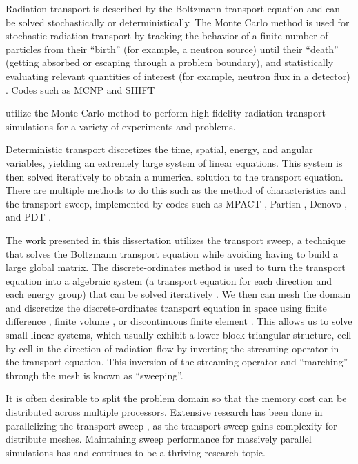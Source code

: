 Radiation transport is described by the Boltzmann transport equation \cite{bell_glasstone,zweifel,davison,duderstadt} and can be solved stochastically or deterministically. 
The Monte Carlo method is used for stochastic radiation transport by tracking the behavior of a finite number of particles from their ``birth'' (for example, a neutron source) until their ``death'' (getting absorbed or escaping through a problem boundary), and statistically evaluating relevant quantities of interest (for example, neutron flux in a detector) \cite{shultis_mc}.
Codes such as MCNP \cite{MCNP} and SHIFT {\cite{shift} utilize the Monte Carlo method to perform high-fidelity radiation transport simulations for a variety of experiments and problems.

Deterministic transport discretizes the time, spatial, energy, and angular variables, yielding an extremely large system of linear equations. This system is then solved iteratively to obtain a numerical solution to the transport equation.
There are multiple methods to do this such as the method of characteristics and the transport sweep, implemented by codes such as MPACT \cite{mpact}, Partisn \cite{partisn}, Denovo \cite{denovo}, and PDT \cite{mpadams2013,mpadams2015}.

The work presented in this dissertation utilizes the transport sweep, a technique that solves the Boltzmann transport equation while avoiding having to build a large global matrix.
The discrete-ordinates method \cite{denovo} is used to turn the transport equation into a algebraic system (a transport equation for each direction and each energy group) that can be solved iteratively \cite{adams_larsen}.
We then can mesh the domain and discretize the discrete-ordinates transport equation in space using finite difference \cite{fd}, finite volume \cite{fd}, or discontinuous finite element \cite{Reed}. 
This allows us to solve small linear systems, which usually exhibit a lower block triangular structure, cell by cell in the direction of radiation flow by inverting the streaming operator in the transport equation. This inversion of the streaming operator and ``marching'' through the mesh is known as ``sweeping''. 

It is often desirable to split the problem domain so that the memory cost can be distributed across multiple processors.
Extensive research has been done in parallelizing the transport sweep \cite{KBA,partisn,denovo,mpadams2013,mpadams2015}, as the transport sweep gains complexity for distribute meshes. Maintaining sweep performance for massively parallel simulations has and continues to be a thriving research topic.

}
